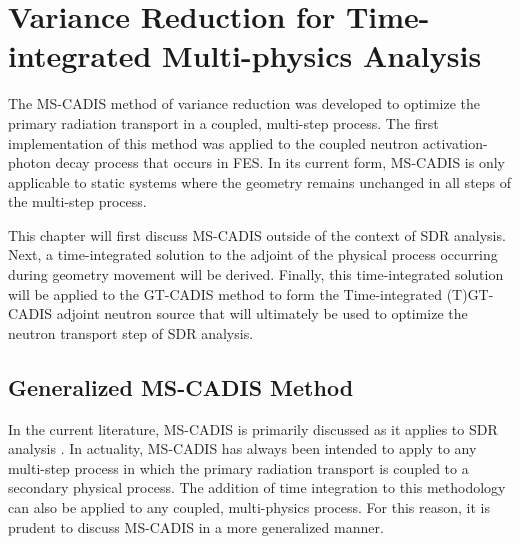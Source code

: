\chapter{Variance Reduction for Time-integrated Multi-physics Analysis}\label{ch:tgt}

The MS-CADIS method of variance reduction 
was developed to optimize the primary radiation transport
in a coupled, multi-step process. The first implementation of this method 
was applied to the coupled neutron activation-photon decay process that occurs
in FES.  
In its current form, MS-CADIS is only applicable to static systems where
the geometry remains unchanged in all steps of the multi-step process.

This chapter will first discuss MS-CADIS outside of the context of SDR analysis. 
Next, a time-integrated solution to the adjoint of the 
physical process occurring during geometry movement will be derived.  
Finally, this time-integrated solution will be applied to the GT-CADIS method to
form the Time-integrated (T)GT-CADIS adjoint neutron source that will
ultimately be used to optimize the neutron transport step of SDR analysis.

\section{Generalized MS-CADIS Method}\label{sec:gen_mscadis}
In the current literature, MS-CADIS is primarily discussed as it applies to SDR
analysis \cite{mscadis}.  In actuality, MS-CADIS has always been intended to
apply to any multi-step process in
which the primary radiation transport is coupled to a secondary physical process.
The addition of time integration to this methodology can also be applied to
any coupled, multi-physics process. For this reason, it is prudent to discuss
MS-CADIS in a more generalized manner.

